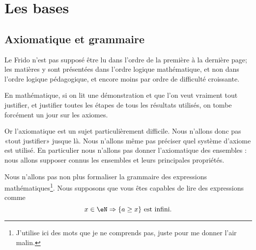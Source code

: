 
\section{Les bases}
\label{SECooIntroBases}

\subsection{Axiomatique et grammaire}
\label{SUBooTheorieEnsembles}

\begin{normaltext}\label{NorooFridoIntro1}
	Le Frido n'est pas supposé être lu dans l'ordre de la première à la dernière page; les matières y sont présentées dans l'ordre logique mathématique, et non dans l'ordre logique pédagogique, et encore moins par ordre de difficulté croissante.

	En mathématique, si on lit une démonstration et que l'on veut vraiment tout justifier, et justifier toutes les étapes de tous les résultats utilisés, on tombe forcément un jour sur les axiomes.

	Or l'axiomatique est un sujet particulièrement difficile. Nous n'allons donc pas «tout justifier» jusque là. Nous n'allons même pas préciser quel système d'axiome est utilisé. En particulier nous n'allons pas donner l'axiomatique des ensembles : nous allons supposer connus les ensembles et leurs principales propriétés.
\end{normaltext}

\begin{normaltext}\label{NorooFridoGrammaire}
	Nous n'allons pas non plus formaliser la grammaire des expressions mathématiques\footnote{J'utilise ici des mots que je ne comprends pas, juste pour me donner l'air malin.}. Nous supposons que vous êtes capables de lire des expressions comme
	\begin{equation}
		x\in \eN\Rightarrow\{ a\geq x \}\text{ est infini}.
	\end{equation}
\end{normaltext}

